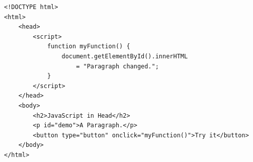 \documentclass[a4paper]{exam}
\begin{document}
				\begin{lstlisting}
<!DOCTYPE html>
<html>
	<head>
		<script>
			function myFunction() {
				document.getElementById().innerHTML 
					= "Paragraph changed.";
			}
		</script>
	</head>
	<body>
		<h2>JavaScript in Head</h2>
		<p id="demo">A Paragraph.</p>
		<button type="button" onclick="myFunction()">Try it</button>
	</body>
</html>
				\end{lstlisting}
				\vfill
\end{document}
